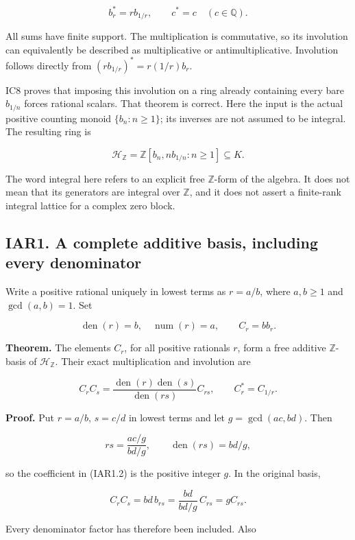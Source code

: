 \documentclass[
]{article}
\begin{document}
\[
b_r^*=r b_{1/r},\qquad c^*=c\quad(c\in\mathbb Q).
\tag{IAR0.2}
\]

All sums have finite support. The multiplication is commutative, so its
involution can equivalently be described as multiplicative or
antimultiplicative. Involution follows directly from
\((r b_{1/r})^*=r(1/r)b_r\).

IC8 proves that imposing this involution on a ring already containing
every bare \(b_{1/n}\) forces rational scalars. That theorem is correct.
Here the input is the actual positive counting monoid \(\{b_n:n\ge1\}\);
its inverses are not assumed to be integral. The resulting ring is

\[
\mathcal H_{\mathbb Z}
=\mathbb Z[b_n,n b_{1/n}:n\ge1]\subseteq K.
\tag{IAR0.3}
\]

The word integral here refers to an explicit free \(\mathbb Z\)-form of
the algebra. It does not mean that its generators are integral over
\(\mathbb Z\), and it does not assert a finite-rank integral lattice for
a complex zero block.

\subsection{IAR1. A complete additive basis, including every
denominator}\label{iar1.-a-complete-additive-basis-including-every-denominator}

Write a positive rational uniquely in lowest terms as \(r=a/b\), where
\(a,b\ge1\) and \(\gcd(a,b)=1\). Set

\[
\operatorname{den}(r)=b,\quad\operatorname{num}(r)=a,
\qquad C_r=b b_r.
\tag{IAR1.1}
\]

\textbf{Theorem.} The elements \(C_r\), for all positive rationals
\(r\), form a free additive \(\mathbb Z\)-basis of
\(\mathcal H_{\mathbb Z}\). Their exact multiplication and involution
are

\[
\boxed{
C_rC_s=
\frac{\operatorname{den}(r)\operatorname{den}(s)}
{\operatorname{den}(rs)}C_{rs},
\qquad C_r^*=C_{1/r}.}
\tag{IAR1.2}
\]

\textbf{Proof.} Put \(r=a/b\), \(s=c/d\) in lowest terms and let
\(g=\gcd(ac,bd)\). Then

\[
rs=\frac{ac/g}{bd/g},\qquad
\operatorname{den}(rs)=bd/g,
\]

so the coefficient in (IAR1.2) is the positive integer \(g\). In the
original basis,

\[
C_rC_s=bd\,b_{rs}
=\frac{bd}{bd/g}\,C_{rs}=g C_{rs}.
\]

Every denominator factor has therefore been included. Also
\end{document}
